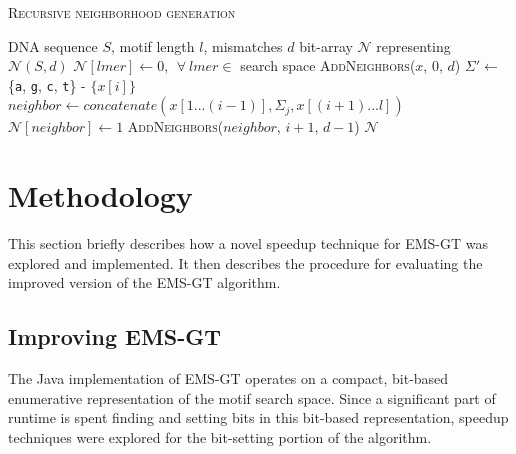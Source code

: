 \documentclass[oneside,12pt]{DISCSthesis}
\begin{document}
{		{
			\noindent \hspace*{6pt}{\bf Algorithm 2.3} \textsc{Recursive neighborhood generation}\small
			\begin{algorithmic}[1]
				\label{alg:recursive-nbr-gen}
				\Require DNA sequence $S$, motif length $l$, mismatches $d$
				\Ensure bit-array $\mathcal{N}$ representing $\mathcal{N}(S,d)$ \vspace*{6pt}
				\State $\mathcal{N}[lmer] \leftarrow 0,\ \ \forall\ lmer \in $ search space 
				\State \textsc{AddNeighbors}($x$, 0, $d$) \hspace*{79pt}
				\EndFor
				\newline
				\State {}
						\State $\Sigma' \leftarrow$ \{\texttt{a}, \texttt{g}, \texttt{c}, \texttt{t}\} - $\{x[i]\}$ \hspace*{79pt}
							\State $neighbor \leftarrow concatenate(x[1...(i-1)],\Sigma_{j},x[(i+1)...l])$
							\State $\mathcal{N}[neighbor] \leftarrow 1$				\hspace*{100pt}
								\State \textsc{AddNeighbors}($neighbor$, $i+1$, $d-1$)
							\EndIf
						\EndFor
					\EndFor
				\EndProcedure
				\State\Return $\mathcal{N}$
				\end{algorithmic}
			}

\chapter{Methodology}
	This section briefly describes how a novel speedup technique for EMS-GT was explored and implemented.
	It then describes the procedure for evaluating the improved version of the EMS-GT algorithm.

	\section{Improving EMS-GT}
		The Java implementation of EMS-GT operates on a compact, bit-based enumerative representation of the motif search space. Since a significant part of runtime is spent finding and setting bits in this bit-based representation, speedup techniques were explored for the bit-setting portion of the algorithm.

}
\end{document}
